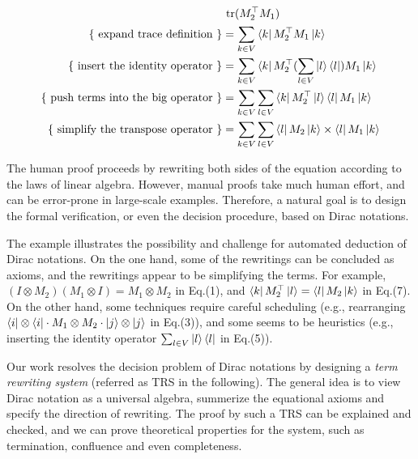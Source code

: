 \begin{align}
  & \ \mathrm{tr}(M_2^\top M_1) \notag \\
  \text{\{ expand trace definition \}} & = \sum_{k \in V} \bra{k} M_2^\top M_1 \ket{k} \\
  \text{\{ insert the identity operator \}} & = \sum_{k \in V} \bra{k} M_2^\top (\sum_{l \in V} \ket{l}\bra{l}) M_1 \ket{k} \\
  \text{\{ push terms into the big operator \}} & = \sum_{k \in V} \sum_{l \in V} \bra{k} M_2^\top \ket{l}\bra{l} M_1 \ket{k} \\
  \text{\{ simplify the transpose operator \}} & = \sum_{k \in V} \sum_{l \in V} \bra{l} M_2 \ket{k} \times \bra{l} M_1 \ket{k}
\end{align}

The human proof proceeds by rewriting both sides of the equation according to the laws of linear algebra. 
However, manual proofs take much human effort, and can be error-prone in large-scale examples. 
Therefore, a natural goal is to design the formal verification, or even the decision procedure, based on Dirac notations.

The example illustrates the possibility and challenge for automated deduction of Dirac notations.
On the one hand, some of the rewritings can be concluded as axioms, and the rewritings appear to be simplifying the terms. For example, $(I \otimes M_2)(M_1 \otimes I) = M_1 \otimes M_2$ in Eq.(1), and $\bra{k}M_2^\top\ket{l} = \bra{l}M_2\ket{k}$ in Eq.(7). On the other hand, some techniques require careful scheduling (e.g., rearranging $\bra{i}\otimes\bra{i}\cdot M_1 \otimes M_2 \cdot \ket{j} \otimes \ket{j}$ in Eq.(3)), and some seems to be heuristics (e.g., inserting the identity operator $\sum_{l \in V}\ket{l}\bra{l}$ in Eq.(5)).

Our work resolves the decision problem of Dirac notations by designing a \textit{term rewriting system} (referred as TRS in the following). The general idea is to view Dirac notation as a universal algebra, summerize the equational axioms and specify the direction of rewriting. The proof by such a TRS can be explained and checked, and we can prove theoretical properties for the system, such as termination, confluence and even completeness.